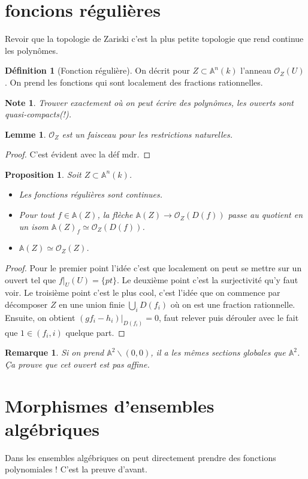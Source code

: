 \documentclass[a4paper,12pt]{book}
\newcommand{\A}{\mathbb{A}}
\newcommand{\Or}{\mathcal{O}}
\theoremstyle{plain}
\newtheorem{lem}[subsection]{Lemme}
\newtheorem{prop}[subsection]{Proposition}
\newtheorem{rem}{Remarque}
\newtheorem{note}{Note}
\theoremstyle{definition}
\newtheorem{defn}[subsection]{Définition}
\theoremstyle{remark}
\begin{document}
\section{foncions régulières}
Revoir que la topologie de Zariski c'est la plus petite topologie que
rend continue les polynômes. 
\begin{defn}[Fonction régulière]
    On décrit pour $Z\subset \A^n(k)$ l'anneau $\Or_Z(U)$. On prend
    les fonctions qui sont localement des fractions rationnelles.
\end{defn}
\begin{note}
    Trouver exactement où on peut écrire des polynômes, les ouverts sont
    quasi-compacts(!).
\end{note}
\begin{lem}
    $\Or_Z$ est un faisceau pour les restrictions naturelles.
\end{lem}
\begin{proof} C'est évident avec la déf mdr. \end{proof}

\begin{prop}
    Soit $Z\subset \A^n(k)$. 
    \begin{itemize}
	\item Les fonctions régulières sont continues.
	\item Pour tout $f\in \A(Z)$, la flèche $\A(Z)\to \Or_Z(D(f))$
	    passe au quotient en un isom $\A(Z)_f \simeq \Or_Z(D(f))$.
	\item $\A(Z)\simeq \Or_Z(Z)$.
    \end{itemize}
\end{prop}
\begin{proof}
    Pour le premier point l'idée c'est que localement on peut se
    mettre sur un ouvert tel que $f|_U(U)=\{pt\}$. Le deuxième point
    c'est la surjectivité qu'y faut voir. Le troisième point c'est
    le plus cool, c'est l'idée que on commence par décomposer 
    $Z$ en une union finie $\bigcup_i D(f_i)$ où on est une fraction
    rationnelle. Ensuite, on obtient $(gf_i-h_i)|_{D(f_i)}=0$, faut 
    relever puis dérouler avec le fait que $1\in(f_i,i)$ quelque part.
\end{proof}
\begin{rem}
    Si on prend $\A^2\backslash (0,0)$, il a les mêmes sections globales
    que $\A^2$. Ça prouve que cet ouvert est pas affine.
\end{rem}
\section{Morphismes d'ensembles algébriques}
Dans les ensembles algébriques on peut directement prendre des 
fonctions polynomiales ! C'est la preuve d'avant. 
\end{document}
